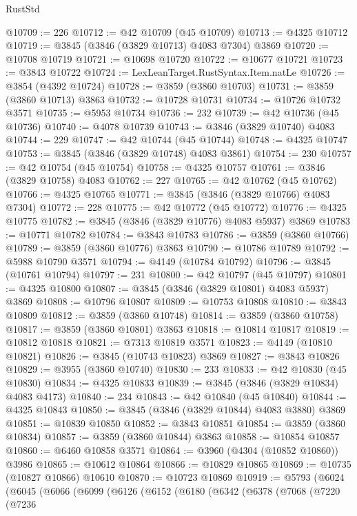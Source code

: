 \begin{lexlean}{RustStd}
\begin{coremodule}
@10709 := 226
@10712 := @42 @10709 (@45 @10709)
@10713 := @4325 @10712
@10719 := @3845 (@3846 (@3829 @10713) @4083 @7304) @3869
@10720 := @10708 @10719
@10721 := @10698 @10720
@10722 := @10677 @10721
@10723 := @3843 @10722
@10724 := LexLeanTarget.RustSyntax.Item.natLe
@10726 := @3854 (@4392 @10724)
@10728 := @3859 (@3860 @10703)
@10731 := @3859 (@3860 @10713) @3863
@10732 := @10728 @10731
@10734 := @10726 @10732 @3571
@10735 := @5953 @10734
@10736 := 232
@10739 := @42 @10736 (@45 @10736)
@10740 := @4078 @10739
@10743 := @3846 (@3829 @10740) @4083
@10744 := 229
@10747 := @42 @10744 (@45 @10744)
@10748 := @4325 @10747
@10753 := @3845 (@3846 (@3829 @10748) @4083 @3861)
@10754 := 230
@10757 := @42 @10754 (@45 @10754)
@10758 := @4325 @10757
@10761 := @3846 (@3829 @10758) @4083
@10762 := 227
@10765 := @42 @10762 (@45 @10762)
@10766 := @4325 @10765
@10771 := @3845 (@3846 (@3829 @10766) @4083 @7304)
@10772 := 228
@10775 := @42 @10772 (@45 @10772)
@10776 := @4325 @10775
@10782 := @3845 (@3846 (@3829 @10776) @4083 @5937) @3869
@10783 := @10771 @10782
@10784 := @3843 @10783
@10786 := @3859 (@3860 @10766)
@10789 := @3859 (@3860 @10776) @3863
@10790 := @10786 @10789
@10792 := @5988 @10790 @3571
@10794 := @4149 (@10784 @10792)
@10796 := @3845 (@10761 @10794)
@10797 := 231
@10800 := @42 @10797 (@45 @10797)
@10801 := @4325 @10800
@10807 := @3845 (@3846 (@3829 @10801) @4083 @5937) @3869
@10808 := @10796 @10807
@10809 := @10753 @10808
@10810 := @3843 @10809
@10812 := @3859 (@3860 @10748)
@10814 := @3859 (@3860 @10758)
@10817 := @3859 (@3860 @10801) @3863
@10818 := @10814 @10817
@10819 := @10812 @10818
@10821 := @7313 @10819 @3571
@10823 := @4149 (@10810 @10821)
@10826 := @3845 (@10743 @10823) @3869
@10827 := @3843 @10826
@10829 := @3955 (@3860 @10740)
@10830 := 233
@10833 := @42 @10830 (@45 @10830)
@10834 := @4325 @10833
@10839 := @3845 (@3846 (@3829 @10834) @4083 @4173)
@10840 := 234
@10843 := @42 @10840 (@45 @10840)
@10844 := @4325 @10843
@10850 := @3845 (@3846 (@3829 @10844) @4083 @3880) @3869
@10851 := @10839 @10850
@10852 := @3843 @10851
@10854 := @3859 (@3860 @10834)
@10857 := @3859 (@3860 @10844) @3863
@10858 := @10854 @10857
@10860 := @6460 @10858 @3571
@10864 := @3960 (@4304 (@10852 @10860)) @3986
@10865 := @10612 @10864
@10866 := @10829 @10865
@10869 := @10735 (@10827 @10866) @10610
@10870 := @10723 @10869
@10919 := @5793
    (@6024
      (@6045
        (@6066
          (@6099
            (@6126
              (@6152
                (@6180
                  (@6342
                    (@6378
                      (@7068
                        (@7220
                          (@7236

\end{coremodule}
\end{lexlean}
